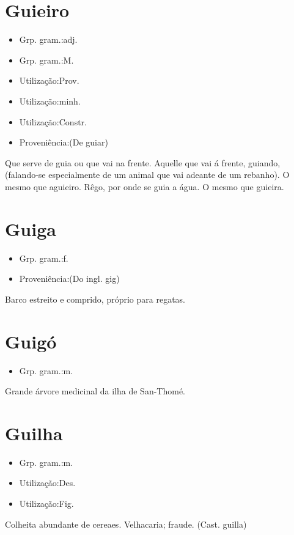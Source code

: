 \section{Guieiro}
\begin{itemize}
\item {Grp. gram.:adj.}
\end{itemize}
\begin{itemize}
\item {Grp. gram.:M.}
\end{itemize}
\begin{itemize}
\item {Utilização:Prov.}
\end{itemize}
\begin{itemize}
\item {Utilização:minh.}
\end{itemize}
\begin{itemize}
\item {Utilização:Constr.}
\end{itemize}
\begin{itemize}
\item {Proveniência:(De \textunderscore guiar\textunderscore )}
\end{itemize}
Que serve de guia ou que vai na frente.
Aquelle que vai á frente, guiando, (falando-se especialmente de um animal que vai adeante de um rebanho).
O mesmo que \textunderscore aguieiro\textunderscore .
Rêgo, por onde se guia a água.
O mesmo que \textunderscore guieira\textunderscore .
\section{Guiga}
\begin{itemize}
\item {Grp. gram.:f.}
\end{itemize}
\begin{itemize}
\item {Proveniência:(Do ingl. \textunderscore gig\textunderscore )}
\end{itemize}
Barco estreito e comprido, próprio para regatas.
\section{Guigó}
\begin{itemize}
\item {Grp. gram.:m.}
\end{itemize}
Grande árvore medicinal da ilha de San-Thomé.
\section{Guilha}
\begin{itemize}
\item {Grp. gram.:m.}
\end{itemize}
\begin{itemize}
\item {Utilização:Des.}
\end{itemize}
\begin{itemize}
\item {Utilização:Fig.}
\end{itemize}
Colheita abundante de cereaes.
Velhacaria; fraude.
(Cast. \textunderscore guilla\textunderscore )
